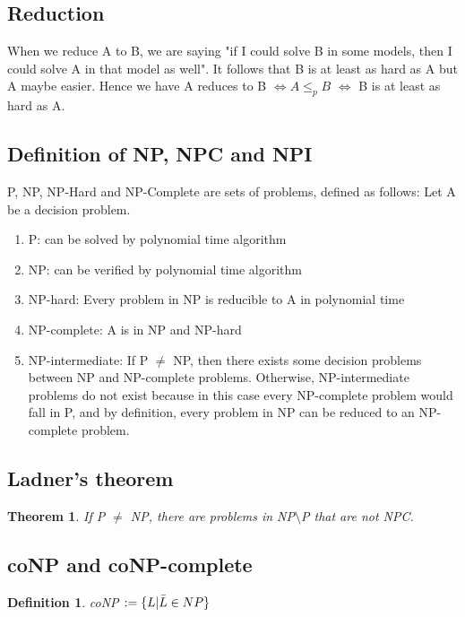 \documentclass[12pt]{article}
\newtheorem{definition}{Definition}
\newtheorem{theorem}{Theorem}
\begin{document}
\subsection{Reduction}

When we reduce A to B, we are saying "if I could solve B in some models, then I could solve A in that model as well". It follows that B is at least as hard as A but A maybe easier. Hence we have A reduces to B $\Leftrightarrow A \leq_p B$ $\Leftrightarrow$ B is at least as hard as A.

\subsection{Definition of NP, NPC and NPI}

P, NP, NP-Hard and NP-Complete are sets of problems, defined as follows:
Let A be a decision problem.
\begin{enumerate}
    \item P: can be solved by polynomial time algorithm
    \item NP: can be verified by polynomial time algorithm
    \item NP-hard: Every problem in NP is reducible to A in polynomial time
    \item NP-complete: A is in NP and NP-hard
    \item NP-intermediate: If P $\ne$ NP, then there exists some decision problems between NP and NP-complete problems. Otherwise, NP-intermediate problems do not exist because in this case every NP-complete problem would fall in P, and by definition, every problem in NP can be reduced to an NP-complete problem.
\end{enumerate}

\subsection{Ladner's theorem}

\begin{theorem}
    If P $\ne$ NP, there are problems in NP$\setminus$P that are not NPC.
\end{theorem}

\subsection{coNP and coNP-complete}

\begin{definition}
    coNP $:= \{L | \Bar{L} \in NP\}$
\end{definition}
\end{document}
